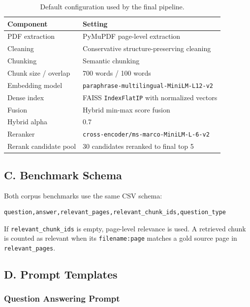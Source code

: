 \documentclass[11pt,a4paper]{article}
\begin{document}
\begin{table}[H]
\centering
\caption{Default configuration used by the final pipeline.}
\label{tab:appendix-final-config}
\begin{tabular}{ll}
\toprule
Component & Setting \\
\midrule
PDF extraction & PyMuPDF page-level extraction \\
Cleaning & Conservative structure-preserving cleaning \\
Chunking & Semantic chunking \\
Chunk size / overlap & 700 words / 100 words \\
Embedding model & \texttt{paraphrase-multilingual-MiniLM-L12-v2} \\
Dense index & FAISS \texttt{IndexFlatIP} with normalized vectors \\
Fusion & Hybrid min-max score fusion \\
Hybrid alpha & 0.7 \\
Reranker & \texttt{cross-encoder/ms-marco-MiniLM-L-6-v2} \\
Rerank candidate pool & 30 candidates reranked to final top 5 \\
\bottomrule
\end{tabular}
\end{table}

\subsection{C. Benchmark Schema}

Both corpus benchmarks use the same CSV schema:

\begin{lstlisting}[caption={Benchmark CSV format.},label={lst:benchmark-schema}]
question,answer,relevant_pages,relevant_chunk_ids,question_type
\end{lstlisting}

If \texttt{relevant\_chunk\_ids} is empty, page-level relevance is used. A
retrieved chunk is counted as relevant when its \texttt{filename:page} matches a
gold source page in \texttt{relevant\_pages}.

\subsection{D. Prompt Templates}

\subsubsection{Question Answering Prompt}
\end{document}
